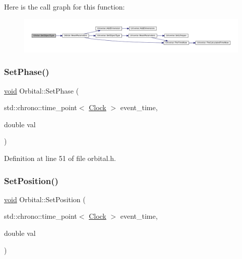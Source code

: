 Here is the call graph for this function\+:\nopagebreak
\begin{figure}[H]
\begin{center}
\leavevmode
\includegraphics[width=350pt]{class_orbital_afd0dfd382d4bf7d9fbace315bd37fa85_cgraph}
\end{center}
\end{figure}
\mbox{\label{class_orbital_ac1c58fcb56e4d5c19c4ab39cc09c88ad}} 
\subsubsection{\texorpdfstring{Set\+Phase()}{SetPhase()}}
{\footnotesize\ttfamily \mbox{\hyperlink{glad_8h_a950fc91edb4504f62f1c577bf4727c29}{void}} Orbital\+::\+Set\+Phase (\begin{DoxyParamCaption}\item[{std\+::chrono\+::time\+\_\+point$<$ \mbox{\hyperlink{universe_8h_a0ef8d951d1ca5ab3cfaf7ab4c7a6fd80}{Clock}} $>$}]{event\+\_\+time,  }\item[{double}]{val }\end{DoxyParamCaption})\hspace{0.3cm}{\ttfamily [inline]}}



Definition at line 51 of file orbital.\+h.

\mbox{\label{class_orbital_a16ff46f7e720f2f7aed332585310a9b8}} 
\subsubsection{\texorpdfstring{Set\+Position()}{SetPosition()}}
{\footnotesize\ttfamily \mbox{\hyperlink{glad_8h_a950fc91edb4504f62f1c577bf4727c29}{void}} Orbital\+::\+Set\+Position (\begin{DoxyParamCaption}\item[{std\+::chrono\+::time\+\_\+point$<$ \mbox{\hyperlink{universe_8h_a0ef8d951d1ca5ab3cfaf7ab4c7a6fd80}{Clock}} $>$}]{event\+\_\+time,  }\item[{double}]{val }\end{DoxyParamCaption})\hspace{0.3cm}{\ttfamily [inline]}}



